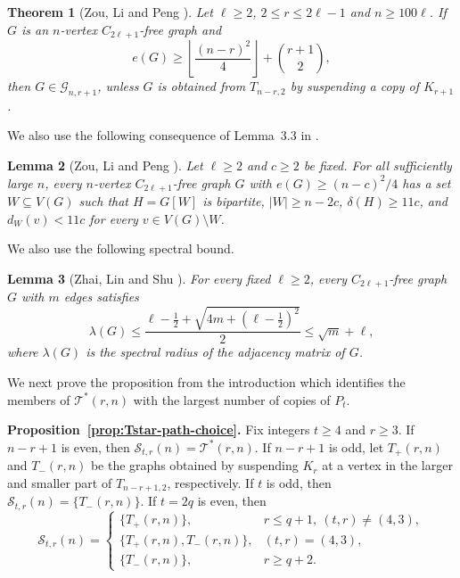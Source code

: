 \documentclass[11pt]{article}
\newtheorem{theorem}{Theorem}[section]
\newtheorem{lemma}[theorem]{Lemma}
\theoremstyle{definition}
\theoremstyle{plain}
\theoremstyle{remark}
\theoremstyle{plain}
\numberwithin{equation}{section}
\newcommand{\cG}{\mathcal G}
\newcommand{\cS}{\mathcal S}
\newcommand{\cT}{\mathcal T}
\begin{document}
\begin{theorem}[Zou, Li and Peng \cite{ZouLiPeng2025}]\label{thm:zlp}
Let $\ell\ge2$, $2\le r\le2\ell-1$ and $n\ge100\ell$. If $G$ is an $n$-vertex $C_{2\ell+1}$-free graph and
\[
        e(G)\ge \left\lfloor\frac{(n-r)^2}{4}\right\rfloor+\binom{r+1}{2},
\]
then $G\in\cG_{n,r+1}$, unless $G$ is obtained from $T_{n-r,2}$ by suspending a copy of $K_{r+1}$.
\end{theorem}

We also use the following consequence of Lemma~3.3 in \cite{ZouLiPeng2025}.

\begin{lemma}[Zou, Li and Peng \cite{ZouLiPeng2025}]\label{lem:zlp-core}
Let $\ell\ge2$ and $c\ge2$ be fixed. For all sufficiently large $n$, every $n$-vertex $C_{2\ell+1}$-free graph $G$ with $e(G)\ge (n-c)^2/4$ has a set $W\subseteq V(G)$ such that $H=G[W]$ is bipartite, $|W|\ge n-2c$, $\delta(H)\ge11c$, and $d_W(v)<11c$ for every $v\in V(G)\setminus W$.
\end{lemma}

We also use the following spectral bound.

\begin{lemma}[Zhai, Lin and Shu \cite{ZhaiLinShu2021}]\label{lem:zls}
For every fixed $\ell\ge2$, every $C_{2\ell+1}$-free graph $G$ with $m$ edges satisfies
\[
        \lambda(G)\le \frac{\ell-\frac12+\sqrt{4m+(\ell-\frac12)^2}}{2}\le\sqrt m+\ell,
\]
where $\lambda(G)$ is the spectral radius of the adjacency matrix of $G$.
\end{lemma}

We next prove the proposition from the introduction which identifies the members of $\cT^*(r,n)$ with the largest number of copies of $P_t$.

\noindent\textbf{Proposition~\ref{prop:Tstar-path-choice}.}
Fix integers $t\ge4$ and $r\ge3$. If $n-r+1$ is even, then $\cS_{t,r}(n)=\cT^*(r,n)$. If $n-r+1$ is odd, let $T_+(r,n)$ and $T_-(r,n)$ be the graphs obtained by suspending $K_r$ at a vertex in the larger and smaller part of $T_{n-r+1,2}$, respectively. If $t$ is odd, then $\cS_{t,r}(n)=\{T_-(r,n)\}$. If $t=2q$ is even, then
\[
        \cS_{t,r}(n)=
        \begin{cases}
        \{T_+(r,n)\}, & r\le q+1,\ (t,r)\ne(4,3),\\
        \{T_+(r,n),T_-(r,n)\}, & (t,r)=(4,3),\\
        \{T_-(r,n)\}, & r\ge q+2.
        \end{cases}
\]
\end{document}
